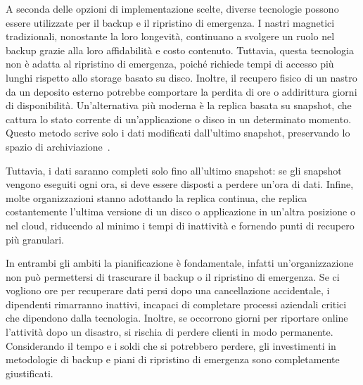         A seconda delle opzioni di implementazione scelte, diverse tecnologie possono essere utilizzate per il backup e il ripristino di emergenza. I nastri magnetici tradizionali, nonostante la loro longevità, continuano a svolgere un ruolo nel backup grazie alla loro affidabilità e costo contenuto. Tuttavia, questa tecnologia non è adatta al ripristino di emergenza, poiché richiede tempi di accesso più lunghi rispetto allo storage basato su disco. Inoltre, il recupero fisico di un nastro da un deposito esterno potrebbe comportare la perdita di ore o addirittura giorni di disponibilità. Un'alternativa più moderna è la replica basata su snapshot, che cattura lo stato corrente di un'applicazione o disco in un determinato momento. Questo metodo scrive solo i dati modificati dall'ultimo snapshot, preservando lo spazio di archiviazione~\cite{ibm_backup_dis_rec_site}. 
        
        Tuttavia, i dati saranno completi solo fino all'ultimo snapshot: se gli snapshot vengono eseguiti ogni ora, si deve essere disposti a perdere un'ora di dati. Infine, molte organizzazioni stanno adottando la replica continua, che replica costantemente l'ultima versione di un disco o applicazione in un'altra posizione o nel cloud, riducendo al minimo i tempi di inattività e fornendo punti di recupero più granulari.
       
        In entrambi gli ambiti la pianificazione  è fondamentale, infatti un'organizzazione non può permettersi di trascurare il backup o il ripristino di emergenza. Se ci vogliono ore per recuperare dati persi dopo una cancellazione accidentale, i dipendenti rimarranno inattivi, incapaci di completare processi aziendali critici che dipendono dalla tecnologia. Inoltre, se occorrono giorni per riportare online l'attività dopo un disastro, si rischia di perdere clienti in modo permanente. Considerando il tempo e i soldi che si potrebbero perdere, gli investimenti in metodologie di backup e piani di ripristino di emergenza sono completamente giustificati.

